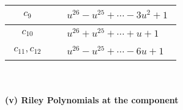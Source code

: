 \documentclass[1p]{elsarticle_modified}
\theoremstyle{definition}
\begin{document}
\begin{tabular}{m{50pt}|m{274pt}}
\hline $$\begin{aligned}c_{9}\end{aligned}$$&$\begin{aligned}
&u^{26}- u^{25}+\cdots-3 u^2+1
\end{aligned}$\\
\hline $$\begin{aligned}c_{10}\end{aligned}$$&$\begin{aligned}
&u^{26}+u^{25}+\cdots+u+1
\end{aligned}$\\
\hline $$\begin{aligned}c_{11},c_{12}\end{aligned}$$&$\begin{aligned}
&u^{26}- u^{25}+\cdots-6 u+1
\end{aligned}$\\
\hline
\end{tabular}\\~\\
\newpage\renewcommand{\arraystretch}{1}
\flushleft \textbf{(v) Riley Polynomials at the component}\newline \\
\end{document}
